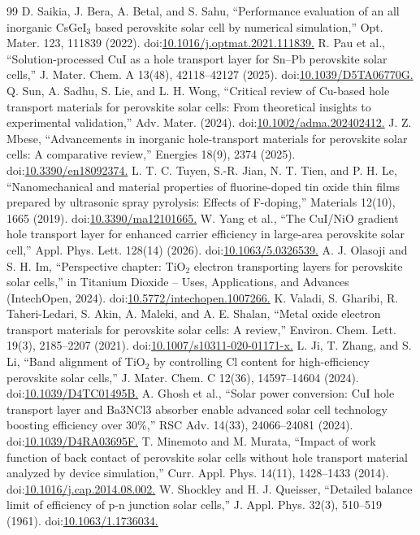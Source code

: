 \documentclass[review]{elsarticle}
\begin{document}
\begin{thebibliography}{99}
 D. Saikia, J. Bera, A. Betal, and S. Sahu, ``Performance evaluation of an all inorganic CsGeI$_{3}$ based perovskite solar cell by numerical simulation,'' Opt. Mater. 123, 111839 (2022). doi:\url{10.1016/j.optmat.2021.111839.}
 R. Pau et al., ``Solution-processed CuI as a hole transport layer for Sn--Pb perovskite solar cells,'' J. Mater. Chem. A 13(48), 42118--42127 (2025). doi:\url{10.1039/D5TA06770G.}
 Q. Sun, A. Sadhu, S. Lie, and L. H. Wong, ``Critical review of Cu-based hole transport materials for perovskite solar cells: From theoretical insights to experimental validation,'' Adv. Mater. (2024). doi:\url{10.1002/adma.202402412.}
 J. Z. Mbese, ``Advancements in inorganic hole-transport materials for perovskite solar cells: A comparative review,'' Energies 18(9), 2374 (2025). doi:\url{10.3390/en18092374.}
 L. T. C. Tuyen, S.-R. Jian, N. T. Tien, and P. H. Le, ``Nanomechanical and material properties of fluorine-doped tin oxide thin films prepared by ultrasonic spray pyrolysis: Effects of F-doping,'' Materials 12(10), 1665 (2019). doi:\url{10.3390/ma12101665.}
 W. Yang et al., ``The CuI/\allowbreak{}NiO gradient hole transport layer for enhanced carrier efficiency in large-area perovskite solar cell,'' Appl. Phys. Lett. 128(14) (2026). doi:\url{10.1063/5.0326539.}
 A. J. Olasoji and S. H. Im, ``Perspective chapter: TiO$_{2}$ electron transporting layers for perovskite solar cells,'' in Titanium Dioxide -- Uses, Applications, and Advances (IntechOpen, 2024). doi:\url{10.5772/intechopen.1007266.}
 K. Valadi, S. Gharibi, R. Taheri-Ledari, S. Akin, A. Maleki, and A. E. Shalan, ``Metal oxide electron transport materials for perovskite solar cells: A review,'' Environ. Chem. Lett. 19(3), 2185--2207 (2021). doi:\url{10.1007/s10311-020-01171-x.}
 L. Ji, T. Zhang, and S. Li, ``Band alignment of TiO$_{2}$ by controlling Cl content for high-efficiency perovskite solar cells,'' J. Mater. Chem. C 12(36), 14597--14604 (2024). doi:\url{10.1039/D4TC01495B.}
 A. Ghosh et al., ``Solar power conversion: CuI hole transport layer and Ba3NCl3 absorber enable advanced solar cell technology boosting efficiency over 30\%,'' RSC Adv. 14(33), 24066--24081 (2024). doi:\url{10.1039/D4RA03695F.}
 T. Minemoto and M. Murata, ``Impact of work function of back contact of perovskite solar cells without hole transport material analyzed by device simulation,'' Curr. Appl. Phys. 14(11), 1428--1433 (2014). doi:\url{10.1016/j.cap.2014.08.002.}
 W. Shockley and H. J. Queisser, ``Detailed balance limit of efficiency of p-n junction solar cells,'' J. Appl. Phys. 32(3), 510--519 (1961). doi:\url{10.1063/1.1736034.}

\end{thebibliography}
\end{document}

